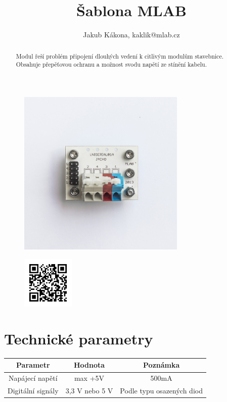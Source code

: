 \documentclass[12pt,a4paper,oneside]{article}
\begin{document}
\title{Šablona MLAB}
\author{Jakub Kákona, kaklik@mlab.cz}
\maketitle

\thispagestyle{empty}
\begin{abstract}
Modul řeší problém připojení dlouhých vedení k citlivým modulům stavebnice. Obsahuje přepěťovou ochranu a možnost svodu napětí ze stínění kabelu. 
\end{abstract}

\begin{figure} [htbp]
\begin{center}
\includegraphics [width=80mm] {./img/UNISERIAL01A_Top_Big.JPG} 
\end{center}
\end{figure}

\begin{figure} [b]
\includegraphics [width=25mm] {./img/UNISERIAL01A_QRcode.png} 
\end{figure}

\newpage
\tableofcontents


\section{Technické parametry}
\begin{table}[htbp]
\begin{center}
\begin{tabular}{|c|c|c|}
\hline
\multicolumn{1}{|c|}{Parametr} & \multicolumn{1}{|c|}{Hodnota} & \multicolumn{1}{|c|}{Poznámka} \\ \hline
Napájecí napětí & max +5V &  500mA \\ \hline
Digitální signály &  3,3 V nebo 5 V &  Podle typu osazených diod \\ \hline\end{tabular}
\end{center}
\end{table}
\end{document}
